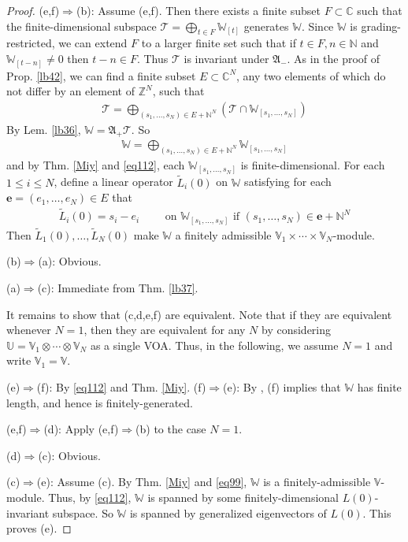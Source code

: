 \documentclass[11pt,b5paper,notitlepage]{article}
\theoremstyle{definition}
\theoremstyle{plain}
\newcommand{\fk}{\mathfrak}
\newcommand{\mc}{\mathcal}
\newcommand{\wtd}{\widetilde}
\newcommand{\mbf}{\mathbf}
\newcommand{\Vbb}{\mathbb V}
\newcommand{\Ubb}{\mathbb U}
\newcommand{\Wbb}{\mathbb W}
\newcommand{\Cbb}{\mathbb C}
\newcommand{\Nbb}{\mathbb N}
\newcommand{\Zbb}{\mathbb Z}
\newcommand{\<}{\left\langle}
\renewcommand{\>}{\right\rangle}
\numberwithin{equation}{subsection}
\begin{document}
\begin{proof}
(e,f)$\Rightarrow$(b): Assume (e,f). Then there exists a finite subset $F\subset\Cbb$ such that the finite-dimensional subspace $\mc T=\bigoplus_{t\in F}\Wbb_{[t]}$ generates $\Wbb$. Since $\Wbb$ is grading-restricted, we can extend $F$ to a larger finite set such that if $t\in F,n\in\Nbb$ and $\Wbb_{[t-n]}\neq 0$ then $t-n\in F$. Thus $\mc T$ is invariant under $\fk A_-$. As in the proof of Prop. \ref{lb42}, we can find a finite subset $E\subset\Cbb^N$, any two elements of which do not differ by an element of $\Zbb^N$, such that
\begin{align*}
\mc T=\bigoplus_{(s_1,\dots,s_N)\in E+\Nbb^N} (\mc T\cap\Wbb_{[s_1,\dots,s_N]})
\end{align*}
By Lem. \ref{lb36}, $\Wbb=\fk A_+\mc T$. So
\begin{align*}
\Wbb=\bigoplus_{(s_1,\dots,s_N)\in E+\Nbb^N}\Wbb_{[s_1,\dots,s_N]}
\end{align*}
and by Thm. \ref{Miy} and \eqref{eq112}, each $\Wbb_{[s_1,\dots,s_N]}$ is finite-dimensional. For each $1\leq i\leq N$, define a linear operator $\wtd L_i(0)$ on $\Wbb$ satisfying for each $\mbf e=(e_1,\dots,e_N)\in E$ that
\begin{align*}
\wtd L_i(0)=s_i-e_i \qquad\text{ on }\Wbb_{[s_1,\dots,s_N]}\text{ if } (s_1,\dots,s_N)\in\mbf e+\Nbb^N
\end{align*} 
Then $\wtd L_1(0),\dots,\wtd L_N(0)$ make $\Wbb$ a finitely admissible $\Vbb_1\times\cdots\times\Vbb_N$-module.

(b)$\Rightarrow$(a): Obvious. 

(a)$\Rightarrow$(c): Immediate from Thm. \ref{lb37}.


It remains to show that (c,d,e,f) are equivalent. Note that if they are equivalent whenever $N=1$, then they are equivalent for any $N$ by considering $\Ubb=\Vbb_1\otimes\cdots\otimes\Vbb_N$ as a single VOA. Thus, in the following, we assume $N=1$ and write $\Vbb_1=\Vbb$.

(e)$\Rightarrow$(f): By \eqref{eq112} and Thm. \ref{Miy}. (f)$\Rightarrow$(e): By \cite[Prop. 4.3]{Hua-projectivecover}, (f) implies that $\Wbb$ has finite length, and hence is finitely-generated.

(e,f)$\Rightarrow$(d): Apply (e,f)$\Rightarrow$(b) to the case $N=1$.

(d)$\Rightarrow$(c): Obvious.

(c)$\Rightarrow$(e): Assume (c). By Thm. \ref{Miy} and \eqref{eq99}, $\Wbb$ is a finitely-admissible $\Vbb$-module. Thus, by \eqref{eq112}, $\Wbb$ is spanned by some finitely-dimensional $L(0)$-invariant subspace. So $\Wbb$ is spanned by generalized eigenvectors of $L(0)$. This proves (e).
\end{proof}
\end{document}
